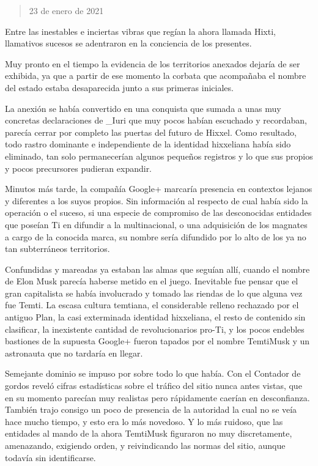 \documentclass[
  spanish,
]{book}
\begin{document}
\begin{quote}
23 de enero de 2021
\end{quote}

Entre las inestables e inciertas vibras que regían la ahora llamada Hixti, llamativos sucesos se adentraron en la conciencia de los presentes.

Muy pronto en el tiempo la evidencia de los territorios anexados dejaría de ser exhibida, ya que a partir de ese momento la corbata que acompañaba el nombre del estado estaba desaparecida junto a sus primeras iniciales.

La anexión se había convertido en una conquista que sumada a unas muy concretas declaraciones de \_Iuri que muy pocos habían escuchado y recordaban, parecía cerrar por completo las puertas del futuro de Hixxel. Como resultado, todo rastro dominante e independiente de la identidad hixxeliana había sido eliminado, tan solo permanecerían algunos pequeños registros y lo que sus propios y pocos precursores pudieran expandir.

Minutos más tarde, la compañía Google+ marcaría presencia en contextos lejanos y diferentes a los suyos propios. Sin información al respecto de cual había sido la operación o el suceso, si una especie de compromiso de las desconocidas entidades que poseían Ti en difundir a la multinacional, o una adquisición de los magnates a cargo de la conocida marca, su nombre sería difundido por lo alto de los ya no tan subterráneos territorios.

Confundidas y mareadas ya estaban las almas que seguían allí, cuando el nombre de Elon Musk parecía haberse metido en el juego. Inevitable fue pensar que el gran capitalista se había involucrado y tomado las riendas de lo que alguna vez fue Temti. La escasa cultura temtiana, el considerable relleno rechazado por el antiguo Plan, la casi exterminada identidad hixxeliana, el resto de contenido sin clasificar, la inexistente cantidad de revolucionarios pro-Ti, y los pocos endebles bastiones de la supuesta Google+ fueron tapados por el nombre TemtiMusk y un astronauta que no tardaría en llegar.

Semejante dominio se impuso por sobre todo lo que había. Con el Contador de gordos reveló cifras estadísticas sobre el tráfico del sitio nunca antes vistas, que en su momento parecían muy realistas pero rápidamente caerían en desconfianza. También trajo consigo un poco de presencia de la autoridad la cual no se veía hace mucho tiempo, y esto era lo más novedoso. Y lo más ruidoso, que las entidades al mando de la ahora TemtiMusk figuraron no muy discretamente, amenazando, exigiendo orden, y reivindicando las normas del sitio, aunque todavía sin identificarse.
\end{document}
